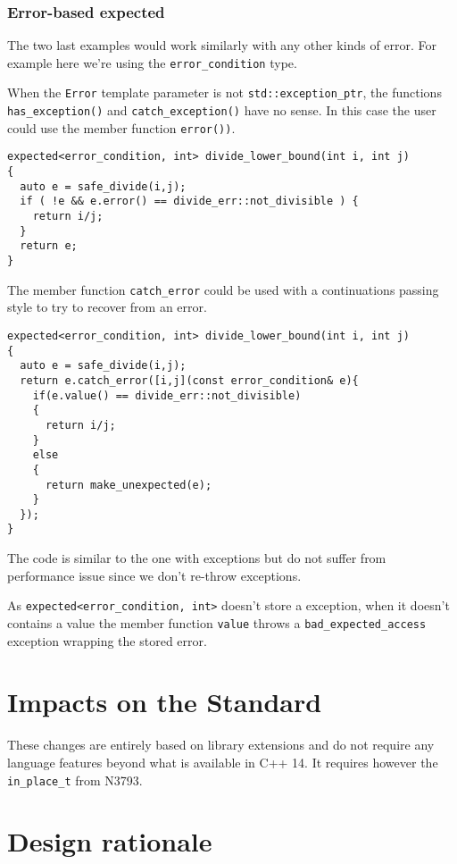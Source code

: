 \documentclass[a4paper,10pt]{article}
\newcommand{\cpp}[1]{\lstinline{#1}}
\begin{document}
\subsubsection{Error-based expected}

The two last examples would work similarly with any other kinds of error. For example here we're using the \cpp{error_condition} type.

When the \cpp{Error} template parameter is not \cpp{std::exception_ptr}, the functions \cpp{has_exception()} and \cpp{catch_exception()} have no sense. In this case the user could use the member function \cpp{error())}.
  
\begin{lstlisting}
expected<error_condition, int> divide_lower_bound(int i, int j)
{
  auto e = safe_divide(i,j);
  if ( !e && e.error() == divide_err::not_divisible ) {
    return i/j;
  }
  return e;
}
\end{lstlisting}

The member function \cpp{catch_error} could be used with a continuations passing style to try to recover from an error.

\begin{lstlisting}
expected<error_condition, int> divide_lower_bound(int i, int j)
{
  auto e = safe_divide(i,j);
  return e.catch_error([i,j](const error_condition& e){
    if(e.value() == divide_err::not_divisible)
    {
      return i/j;
    }
    else
    {
      return make_unexpected(e);
    }
  });
}
\end{lstlisting}

The code is similar to the one with exceptions but do not suffer from performance issue since we don't re-throw exceptions.

As \cpp{expected<error_condition, int>} doesn't store a exception, when it doesn't contains a value the member function \cpp{value} throws a \cpp{bad_expected_access} exception wrapping the stored error. 

\section{Impacts on the Standard}

These changes are entirely based on library extensions and do not require any language features beyond what is available in C++ 14. It requires however the \cpp{in_place_t} from N3793.

\section{Design rationale}
\end{document}
